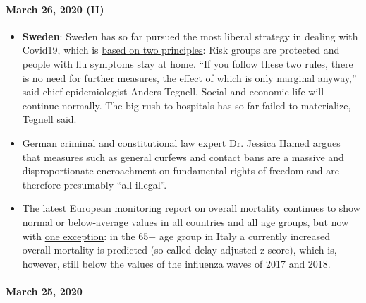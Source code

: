 \hypertarget{march-26-2020-ii}{%
\paragraph{March 26, 2020 (II)}\label{march-26-2020-ii}}

\begin{itemize}
\tightlist
\item
  \textbf{Sweden}: Sweden has so far pursued the most liberal strategy
  in dealing with Covid19, which is
  \href{https://www.zeit.de/politik/ausland/2020-03/coronavirus-schweden-stockholm-oeffentliches-leben/komplettansicht}{based
  on two principles}: Risk groups are protected and people with flu
  symptoms stay at home. ``If you follow these two rules, there is no
  need for further measures, the effect of which is only marginal
  anyway,'' said chief epidemiologist Anders Tegnell. Social and
  economic life will continue normally. The big rush to hospitals has so
  far failed to materialize, Tegnell said.
\item
  German criminal and constitutional law expert Dr. Jessica Hamed
  \href{https://www.fr.de/politik/coronakrise-deutschland-sind-kontaktsperren-ausgangsbeschraenkungen-rechtswidrig-13611821.html}{argues
  that} measures such as general curfews and contact bans are a massive
  and disproportionate encroachment on fundamental rights of freedom and
  are therefore presumably ``all illegal''.
\item
  The \href{https://www.euromomo.eu/index.html}{latest European
  monitoring report} on overall mortality continues to show normal or
  below-average values in all countries and all age groups, but now with
  \href{https://www.euromomo.eu/outputs/zscore_country65.html}{one
  exception}: in the 65+ age group in Italy a currently increased
  overall mortality is predicted (so-called delay-adjusted z-score),
  which is, however, still below the values of the influenza waves of
  2017 and 2018.
\end{itemize}

\hypertarget{march-25-2020}{%
\paragraph{March 25, 2020}\label{march-25-2020}}

